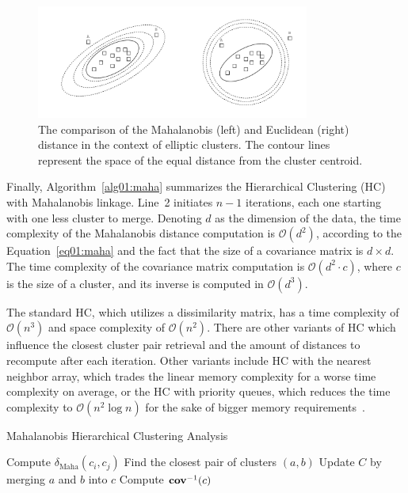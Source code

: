 \begin{figure}[h]
    \centering
    \includegraphics[width=0.8\textwidth]{img/maha.drawio.pdf}
    \caption{The comparison of the Mahalanobis (left) and Euclidean (right) distance in the context of elliptic clusters. The contour lines represent the space of the equal distance from the cluster centroid.}
    \label{fig:ellipses}
\end{figure}

Finally, Algorithm~\ref{alg01:maha} summarizes the Hierarchical Clustering (HC) with Mahalanobis linkage. Line~2 initiates $n-1$ iterations, each one starting with one less cluster to merge. Denoting $d$ as the dimension of the data, the time complexity of the Mahalanobis distance computation is $\mathcal{O}(d^2)$, according to the Equation~\ref{eq01:maha} and the fact that the size of a covariance matrix is $d \times d$. The time complexity of the covariance matrix computation is $\mathcal{O}(d^2 \cdot c)$, where $c$ is the size of a cluster, and its inverse is computed in $\mathcal{O}(d^3)$.

The standard HC, which utilizes a dissimilarity matrix, has a time complexity of $\mathcal{O}(n^3)$ and space complexity of $\mathcal{O}(n^2)$. There are other variants of HC which influence the closest cluster pair retrieval and the amount of distances to recompute after each iteration. Other variants include HC with the nearest neighbor array, which trades the linear memory complexity for a worse time complexity on average, or the HC with priority queues, which reduces the time complexity to $\mathcal{O}(n^2 \log n)$ for the sake of bigger memory requirements~\cite{day1984efficient}.

\begin{algorithm}[t]
    \caption{Mahalanobis Hierarchical Clustering Analysis}
    \label{alg01:maha}
    \begin{algorithmic}[1]
                \State Compute $\delta_\text{Maha}(c_i,c_j)$ 
            \EndFor
            \State Find the closest pair of clusters $(a, b)$
            \State Update $C$ by merging $a$ and $b$ into $c$
            \State Compute $\operatorname{\textbf{cov}}^{-1}(c)$ 
        \EndWhile
        \EndProcedure
    \end{algorithmic}
\end{algorithm}

